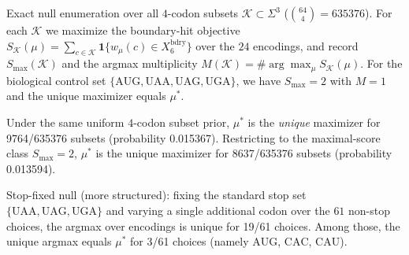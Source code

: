 Exact null enumeration over all $4$-codon subsets $\mathcal{K}\subset\Sigma^3$ ($\binom{64}{4}=635376$). For each $\mathcal{K}$ we maximize the boundary-hit objective $S_{\mathcal{K}}(\mu)=\sum_{c\in\mathcal{K}}\mathbf{1}\{w_\mu(c)\in X_6^{\mathrm{bdry}}\}$ over the $24$ encodings, and record $S_{\max}(\mathcal{K})$ and the argmax multiplicity $M(\mathcal{K})=\#\arg\max_{\mu} S_{\mathcal{K}}(\mu)$. For the biological control set $\{\mathrm{AUG,UAA,UAG,UGA}\}$, we have $S_{\max}=2$ with $M=1$ and the unique maximizer equals $\mu^\ast$.

Under the same uniform $4$-codon subset prior, $\mu^\ast$ is the \emph{unique} maximizer for 9764/635376 subsets (probability 0.015367).
Restricting to the maximal-score class $S_{\max}=2$, $\mu^\ast$ is the unique maximizer for 8637/635376 subsets (probability 0.013594).

Stop-fixed null (more structured): fixing the standard stop set $\{\mathrm{UAA,UAG,UGA}\}$ and varying a single additional codon over the $61$ non-stop choices, the argmax over encodings is unique for 19/61 choices. Among those, the unique argmax equals $\mu^\ast$ for 3/61 choices (namely $\mathrm{AUG}$, $\mathrm{CAC}$, $\mathrm{CAU}$).
